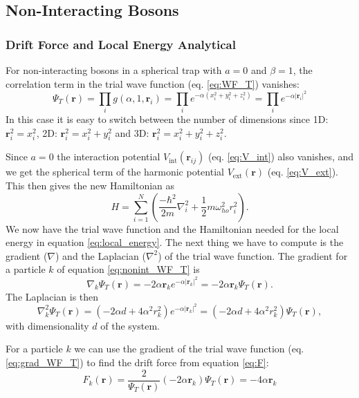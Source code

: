 \documentclass[12pt,a4paper,english]{article}
\begin{document}
\subsection{Non-Interacting Bosons}
\label{subsect:non-int}
\subsubsection{Drift Force and Local Energy Analytical}
\label{subsubsect:EL_analytic}
For non-interacting bosons in a spherical trap with $a=0$ and $\beta=1$, the correlation term in the trial wave function (eq. \ref{eq:WF_T}) vanishes:
\begin{equation}
\label{eq:nonint_WF_T}
\Psi_T(\textbf{r})=\prod_i g(\alpha,1,\mathbf{r}_i)=\prod_{i}e^{-\alpha(x_i^2+y_i^2+z_i^2)}=\prod_{i}e^{-\alpha|\textbf{r}_i|^2}
\end{equation}
In this case it is easy to switch between the number of dimensions since 1D: $\textbf{r}_i^2=x_i^2$, 2D: $\textbf{r}_i^2=x_i^2+y_i^2$ and 3D: $\textbf{r}_i^2=x_i^2+y_i^2+z_i^2$.

Since $a=0$ the interaction potential $V_{\text{int}}(\textbf{r}_{ij})$ (eq. \ref{eq:V_int}) also vanishes, and we get the spherical term of the harmonic potential $V_{\text{ext}}(\textbf{r})$ (eq. \ref{eq:V_ext}). This then gives the new Hamiltonian as
\begin{equation}
\label{eq:non-int_H}
H=\sum_{i=1}^N\left(\frac{-\hbar^2}{2m}\nabla_i^2+\frac{1}{2}m\omega_{ho}^2r_i^2\right).
\end{equation}
We now have the trial wave function and the Hamiltonian needed for the local energy in equation \ref{eq:local_energy}. The next thing we have to compute is the gradient ($\nabla$) and the Laplacian ($\nabla^2$) of the trial wave function. The gradient for a particle $k$ of equation \ref{eq:nonint_WF_T} is
\begin{equation}
\label{eq:grad_WF_T}
\nabla_k\Psi_T(\textbf{r})=-2\alpha \textbf{r}_ke^{-\alpha|\textbf{r}_k|^2}=-2\alpha \textbf{r}_k\Psi_T(\textbf{r}).
\end{equation} 
The Laplacian is then
\begin{equation}
\label{eq:Laplacian_WF_T}
\nabla_k^2\Psi_T(\textbf{r})=(-2\alpha d+4\alpha^2r_k^2)e^{-\alpha|\textbf{r}_k|^2}=(-2\alpha d+4\alpha^2r_k^2)\Psi_T(\textbf{r}),
\end{equation}
with dimensionality $d$ of the system.

For a particle $k$ we can use the gradient of the trial wave function (eq. \ref{eq:grad_WF_T}) to find the drift force from equation \ref{eq:F}:
\begin{equation}
\label{eq:Drift_F_nonint}
F_k(\textbf{r})=\frac{2}{\Psi_T(\textbf{r})}(-2\alpha \textbf{r}_k)\Psi_T(\textbf{r})=-4\alpha\textbf{r}_k
\end{equation}
\end{document}
